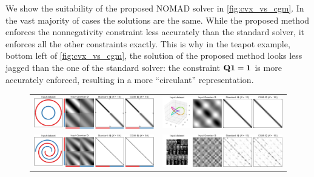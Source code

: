 \documentclass[twoside,11pt]{article}
\begin{document}
We show the suitability of the proposed NOMAD solver in \cref{fig:cvx_vs_cgm}. In the vast majority of cases the solutions are the same. While the proposed method enforces the nonnegativity constraint less accurately than the standard solver, it enforces all the other constraints exactly. This is why in the teapot example, bottom left of \cref{fig:cvx_vs_cgm}, the solution of the proposed method looks less jagged than the one of the standard solver: the constraint ${\mathbf{Q}} {\mathbf{1}} = {\mathbf{1}}$ is more accurately enforced, resulting in a more ``circulant'' representation.

\begin{figure}
	\centering
    \begin{tabu} to 
		\includegraphics[width=\linewidth]{cvx_vs_cgm/circles_cvx_vs_cgm} &
        \includegraphics[width=\linewidth]{cvx_vs_cgm/trefoil_knot_cvx_vs_cgm} \\

		\addlinespace[1em]

    	\includegraphics[width=\linewidth]{cvx_vs_cgm/double_swiss_roll_cvx_vs_cgm} &
    	\includegraphics[width=\linewidth]{cvx_vs_cgm/yale_cvx_vs_cgm} \\
        

\end{tabu}
\end{figure}
\end{document}
